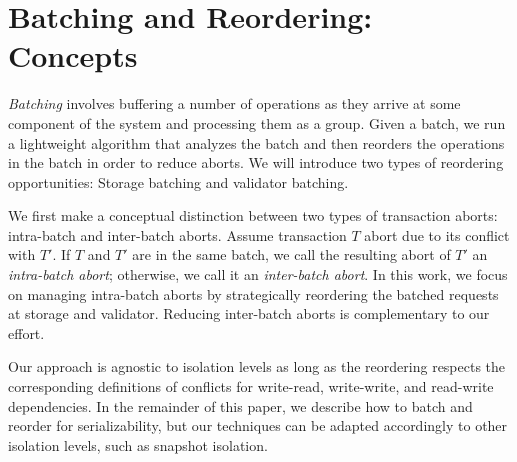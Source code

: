 \section{Batching and Reordering: Concepts}\label{sec:overview}


\emph{Batching} involves buffering a number of operations as they arrive at some component of the system and processing them as a group. 
Given a batch, we run a lightweight algorithm that analyzes the batch and then reorders the operations in the batch in order to reduce aborts. We will introduce two types of reordering opportunities: Storage batching and validator batching.

We first make a conceptual distinction between two types of transaction aborts: intra-batch and inter-batch aborts. Assume transaction $T$ abort due to its conflict with $T'$. If $T$ and $T'$ are in the same batch, we call the resulting abort of $T'$ an \emph{intra-batch abort}; otherwise, we call it an \emph{inter-batch abort}.
In this work, we focus on managing intra-batch aborts by strategically reordering the batched requests at storage and validator. 
Reducing inter-batch aborts is complementary to our effort. 

Our approach is agnostic to isolation levels as long as the reordering respects the corresponding definitions of conflicts for 
write-read, write-write, and read-write dependencies. In the remainder of this paper, we describe 
how to batch and reorder for serializability, but our techniques can be adapted accordingly to other isolation levels, 
such as snapshot isolation.


